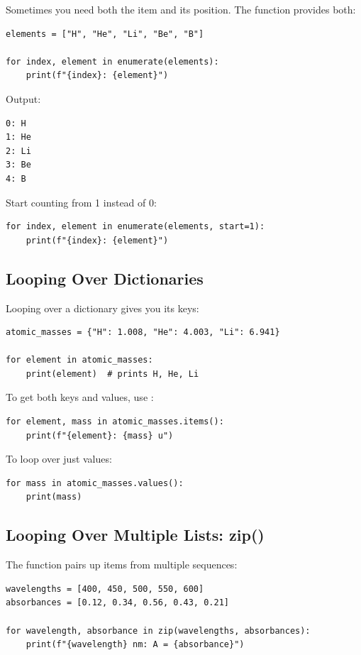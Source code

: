 Sometimes you need both the item and its position. The  function provides both:

\begin{lstlisting}
elements = ["H", "He", "Li", "Be", "B"]

for index, element in enumerate(elements):
    print(f"{index}: {element}")
\end{lstlisting}

Output:
\begin{lstlisting}[style=outputstyle]
0: H
1: He
2: Li
3: Be
4: B
\end{lstlisting}

Start counting from 1 instead of 0:

\begin{lstlisting}
for index, element in enumerate(elements, start=1):
    print(f"{index}: {element}")
\end{lstlisting}

\subsection{Looping Over Dictionaries}

Looping over a dictionary gives you its keys:

\begin{lstlisting}
atomic_masses = {"H": 1.008, "He": 4.003, "Li": 6.941}

for element in atomic_masses:
    print(element)  # prints H, He, Li
\end{lstlisting}

To get both keys and values, use :

\begin{lstlisting}
for element, mass in atomic_masses.items():
    print(f"{element}: {mass} u")
\end{lstlisting}

To loop over just values:

\begin{lstlisting}
for mass in atomic_masses.values():
    print(mass)
\end{lstlisting}

\subsection{Looping Over Multiple Lists: zip()}

The  function pairs up items from multiple sequences:

\begin{lstlisting}
wavelengths = [400, 450, 500, 550, 600]
absorbances = [0.12, 0.34, 0.56, 0.43, 0.21]

for wavelength, absorbance in zip(wavelengths, absorbances):
    print(f"{wavelength} nm: A = {absorbance}")
\end{lstlisting}

